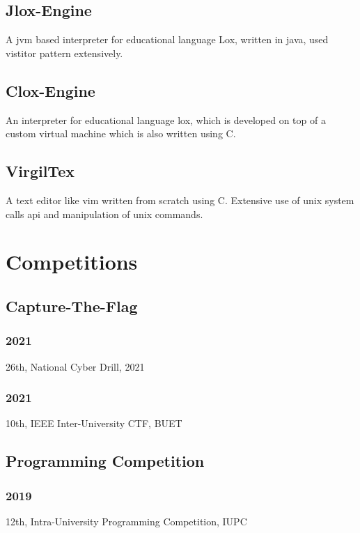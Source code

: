 \documentclass[a4paper,8pt]{extarticle}
\begin{document}
\subsection{Jlox-Engine}
A jvm based interpreter for educational language Lox, written in java, used vistitor pattern extensively.
\subsection{Clox-Engine}
An interpreter for educational language lox, which is developed on top of a custom virtual machine which is also written using C.
\subsection{VirgilTex}
A text editor like vim written from scratch using C. Extensive use of unix system calls api and manipulation of unix commands.
\section{Competitions}
\subsection{Capture-The-Flag}
\subsubsection{2021}
26th, National Cyber Drill, 2021
\subsubsection{2021}
10th, IEEE Inter-University CTF, BUET
\subsection{Programming Competition}
\subsubsection{2019}
 12th, Intra-University Programming Competition, IUPC
\end{document}
